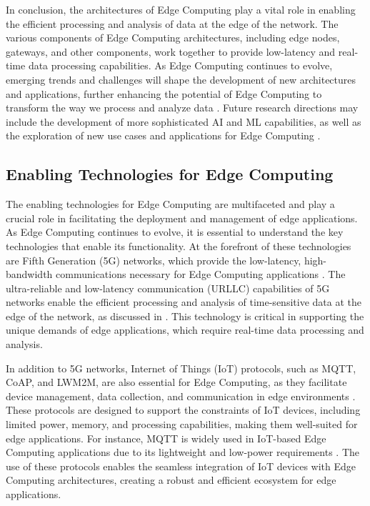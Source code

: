 \documentclass[11pt,a4paper]{article}
\begin{document}
In conclusion, the architectures of Edge Computing play a vital role in enabling the efficient processing and analysis of data at the edge of the network. The various components of Edge Computing architectures, including edge nodes, gateways, and other components, work together to provide low-latency and real-time data processing capabilities. As Edge Computing continues to evolve, emerging trends and challenges will shape the development of new architectures and applications, further enhancing the potential of Edge Computing to transform the way we process and analyze data \cite{arxiv:1909.08747}. Future research directions may include the development of more sophisticated AI and ML capabilities, as well as the exploration of new use cases and applications for Edge Computing \cite{arxiv:1912.00595}.


\subsection{Enabling Technologies for Edge Computing}


The enabling technologies for Edge Computing are multifaceted and play a crucial role in facilitating the deployment and management of edge applications. As Edge Computing continues to evolve, it is essential to understand the key technologies that enable its functionality. At the forefront of these technologies are Fifth Generation (5G) networks, which provide the low-latency, high-bandwidth communications necessary for Edge Computing applications \cite{arxiv:1702.05309}. The ultra-reliable and low-latency communication (URLLC) capabilities of 5G networks enable the efficient processing and analysis of time-sensitive data at the edge of the network, as discussed in \cite{arxiv:2107.13374}. This technology is critical in supporting the unique demands of edge applications, which require real-time data processing and analysis.

In addition to 5G networks, Internet of Things (IoT) protocols, such as MQTT, CoAP, and LWM2M, are also essential for Edge Computing, as they facilitate device management, data collection, and communication in edge environments \cite{arxiv:1807.00976}. These protocols are designed to support the constraints of IoT devices, including limited power, memory, and processing capabilities, making them well-suited for edge applications. For instance, MQTT is widely used in IoT-based Edge Computing applications due to its lightweight and low-power requirements \cite{arxiv:2402.13056}. The use of these protocols enables the seamless integration of IoT devices with Edge Computing architectures, creating a robust and efficient ecosystem for edge applications.
\end{document}
